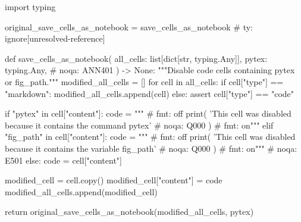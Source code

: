 \documentclass[oneside]{book}
\begin{document}
\begin{pycell}
import typing

original_save_cells_as_notebook = save_cells_as_notebook  # ty: ignore[unresolved-reference]


def save_cells_as_notebook(
    all_cells: list[dict[str, typing.Any]],
    pytex: typing.Any,  # noqa: ANN401
) -> None:
    """Disable code cells containing pytex or fig_path."""
    modified_all_cells = []
    for cell in all_cells:
        if cell["type"] == "markdown":
            modified_all_cells.append(cell)
        else:
            assert cell["type"] == "code"

            if "pytex" in cell["content"]:
                code = """
# fmt: off
print(
    'This cell was disabled because it contains the command pytex'  # noqa: Q000
)
# fmt: on"""
            elif "fig_path" in cell["content"]:
                code = """
# fmt: off
print(
    'This cell was disabled because it contains the variable fig_path'  # noqa: Q000
)
# fmt: on"""  # noqa: E501
            else:
                code = cell["content"]

            modified_cell = cell.copy()
            modified_cell["content"] = code
            modified_all_cells.append(modified_cell)

    return original_save_cells_as_notebook(modified_all_cells, pytex)
\end{pycell}
\end{document}
